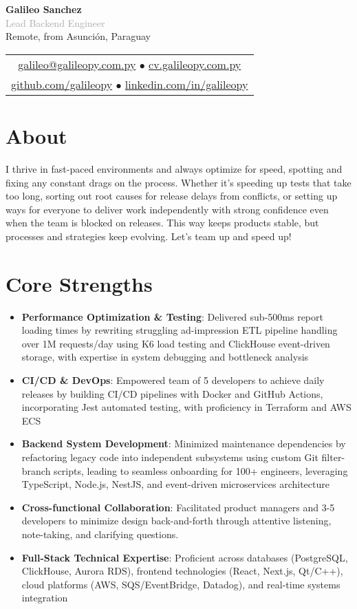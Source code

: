 \documentclass[11pt,a4paper]{article}
\newcommand{\cvheader}[5]{
  \begin{center}
    {\LARGE \textbf{#1}}\\[0.1em]
    {\large \textcolor{darkgray}{#2}}\\[0.1em]
    
    \textcolor{mediumgray}{#3}\\[0.1em]
    
    \begin{tabular}{c}
      \href{mailto:#4}{#4} $\bullet$ \href{https://#5}{#5}\\[0.1em]
      \href{https://github.com/galileopy}{github.com/galileopy} $\bullet$ 
      \href{https://www.linkedin.com/in/galileopy}{linkedin.com/in/galileopy}
    \end{tabular}
  \end{center}
}
\begin{document}
\cvheader{Galileo Sanchez}{Lead Backend Engineer}{Remote, from Asunción, Paraguay}{galileo@galileopy.com.py}{cv.galileopy.com.py}

\section{About}
I thrive in fast-paced environments and always optimize for speed, spotting and fixing any constant drags on the process. Whether it's speeding up tests that take too long, sorting out root causes for release delays from conflicts,  or setting up ways for everyone to deliver work independently with strong confidence even when the team is blocked on releases. This way keeps products stable, but processes and strategies keep evolving. Let's team up and speed up!

\section{Core Strengths}

\begin{itemize}
\item \textbf{Performance Optimization \& Testing}: Delivered sub-500ms report loading times by rewriting struggling ad-impression ETL pipeline handling over 1M requests/day using K6 load testing and ClickHouse event-driven storage, with expertise in system debugging and bottleneck analysis
\item \textbf{CI/CD \& DevOps}: Empowered team of 5 developers to achieve daily releases by building CI/CD pipelines with Docker and GitHub Actions, incorporating Jest automated testing, with proficiency in Terraform and AWS ECS
\item \textbf{Backend System Development}: Minimized maintenance dependencies by refactoring legacy code into independent subsystems using custom Git filter-branch scripts, leading to seamless onboarding for 100+ engineers, leveraging TypeScript, Node.js, NestJS, and event-driven microservices architecture
\item \textbf{Cross-functional Collaboration}: Facilitated product managers and 3-5 developers to minimize design back-and-forth through attentive listening, note-taking, and clarifying questions.
\item \textbf{Full-Stack Technical Expertise}: Proficient across databases (PostgreSQL, ClickHouse, Aurora RDS), frontend technologies (React, Next.js, Qt/C++), cloud platforms (AWS, SQS/EventBridge, Datadog), and real-time systems integration
\end{itemize}
\end{document}
